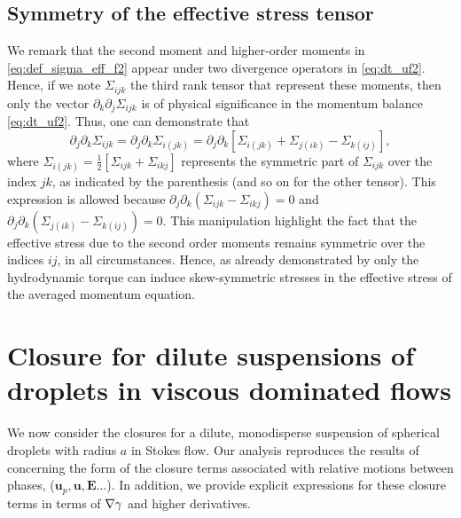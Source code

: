 \subsection{Symmetry of the effective stress tensor}
We remark that the second moment and higher-order moments in \ref{eq:def_sigma_eff_f2} appear under two divergence operators in \ref{eq:dt_uf2}. 
Hence, if we note $\Sigma_{ijk}$ the third rank tensor that represent these moments, then only the vector $\partial_k \partial_j\Sigma_{ijk}$ is of physical significance in the momentum balance \eqref{eq:dt_uf2}.
Thus, one can demonstrate that \citep{lhuillier1996contribution}
\begin{equation}
    \partial_j \partial_k \Sigma_{ijk}
    = \partial_j \partial_k \Sigma_{i(jk)}
    =
    \partial_j \partial_k \left[
        \Sigma_{i(jk)}
        + \Sigma_{j(ik)}
        - \Sigma_{k(ij)}
    \right],
    \label{eq:sym_proof}
\end{equation}
where $\Sigma_{i(jk)} = \frac{1}{2}[\Sigma_{ijk} + \Sigma_{ikj}]$ represents the symmetric part of $\Sigma_{ijk}$ over the index $jk$, as indicated by the parenthesis (and so on for the other tensor). 
This expression is allowed because $\partial_j \partial_k (\Sigma_{ijk} - \Sigma_{ikj}) = 0$ and $\partial_j \partial_k (\Sigma_{j(ik)} - \Sigma_{k(ij)}) = 0$. 
This manipulation highlight the fact that the effective stress due to the second order moments remains symmetric over the indices $ij$, in all circumstances.
Hence, as already demonstrated by \citet{lhuillier1996contribution} only the hydrodynamic torque can induce skew-symmetric stresses in the effective stress of the averaged momentum equation. 



\section{Closure for dilute suspensions of droplets in viscous dominated flows}
\label{sec:closure}
We now consider the closures for a dilute, monodisperse suspension of spherical droplets with radius $a$ in Stokes flow. 
Our analysis reproduces the results of \citet[Appendix B]{zhang1997momentum} concerning the form of the closure terms associated with relative motions between phases, ($\textbf{u}_p, \textbf{u}, \textbf{E}\ldots$). 
In addition, we provide explicit expressions for these closure terms in terms of $\mathbf{\nabla}\gamma$ and higher derivatives. 

